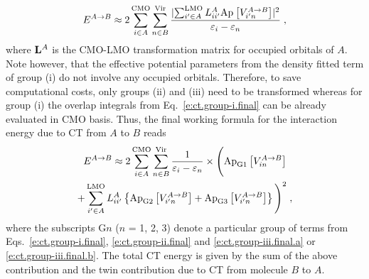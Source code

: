 %
\begin{equation} \label{e:ect-oep.prefinal}
 E^{A\rightarrow B} \approx
 2 
 \sum_{i\in A}^{\rm CMO}
 \sum_{n\in B}^{\rm Vir}
 \frac{
 \lvert
   \sum_{i'\in A}^{\rm LMO} L_{ii'}^A
   \Approx{V_{i'n}^{A\rightarrow B}}{} 
 \rvert^2 }{\varepsilon_i - \varepsilon_n} \;,
\end{equation}
%
where ${\bf L}^A$ is the CMO\hyp{}LMO transformation matrix for occupied orbitals of $A$. 
Note however, that the effective potential parameters from the density fitted term of group (i) 
do not involve any occupied orbitals.
Therefore, to save computational costs, only groups (ii) and (iii) need to be transformed
whereas for group (i) the overlap integrals from Eq.~\eqref{e:ct.group-i.final} 
can be already evaluated in CMO basis.
Thus, the final working formula for the interaction energy due to CT from $A$ to $B$ reads
%
\begin{multline} \label{e:ect-oep.final}
 E^{A\rightarrow B} \approx
 2 
 \sum_{i\in A}^{\rm CMO}
 \sum_{n\in B}^{\rm Vir}
 \frac{1}{\varepsilon_i - \varepsilon_n} \times 
 \Bigg(
   \Approx{V_{in}^{A\rightarrow B}}{\rm G1} \\
  +
   \sum_{i'\in A}^{\rm LMO} L_{ii'}^A
   \left\{
   \Approx{V_{i'n}^{A\rightarrow B}}{\rm G2} 
  +\Approx{V_{i'n}^{A\rightarrow B}}{\rm G3}
  \right\}
 \Bigg)^2 \;,
\end{multline}
%
where the subscripts G$n$ ($n$ = 1, 2, 3) denote a particular group of 
terms from Eqs.~\eqref{e:ct.group-i.final}, \eqref{e:ct.group-ii.final} and \eqref{e:ct.group-iii.final.a}
or \eqref{e:ct.group-iii.final.b}. 
The total CT energy is given by the sum of the above contribution and the twin contribution
due to CT from molecule $B$ to $A$.

%


